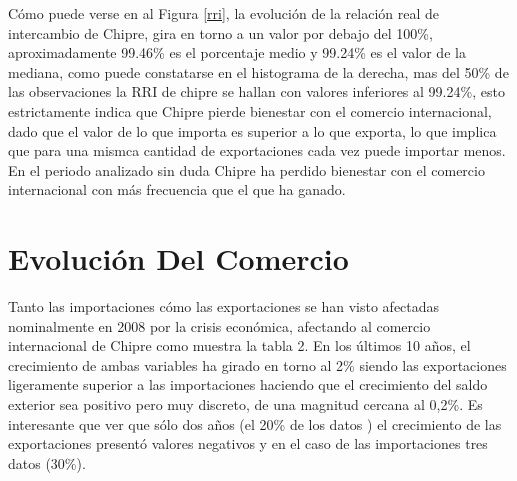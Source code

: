 \documentclass[a4paper,openright,12pt]{book}
\begin{document}
Cómo puede verse en al Figura \ref{rri}, la evolución de la relación real de intercambio de Chipre, gira en torno a un valor por debajo del 100\%, aproximadamente 99.46\% es el porcentaje medio y 99.24\% es el valor de la mediana, como puede constatarse en el histograma de la derecha, mas del 50\% de las observaciones la RRI de chipre se hallan con valores inferiores al 99.24\%, esto estrictamente indica que Chipre pierde bienestar con el comercio internacional, dado que el valor de lo que importa es superior a lo que exporta, lo que implica que para una mismca cantidad de exportaciones cada vez puede importar menos. En el periodo analizado sin duda Chipre ha perdido bienestar con el comercio internacional con más frecuencia que el que ha ganado.


\chapter{Evolución Del Comercio}
\label{cap2EvoComer}

Tanto las importaciones cómo las exportaciones se han visto afectadas nominalmente en 2008 por la crisis económica, afectando al comercio internacional de Chipre como muestra la tabla 2. En los últimos 10 años, el crecimiento de ambas variables ha girado en torno al 2\% siendo las exportaciones ligeramente superior a las importaciones haciendo que el crecimiento del saldo exterior sea positivo pero muy discreto, de una magnitud cercana al 0,2\%. Es interesante que ver que sólo dos años (el 20\% de los datos ) el crecimiento de las exportaciones presentó valores negativos y en el caso de las importaciones tres datos (30\%).
\end{document}
